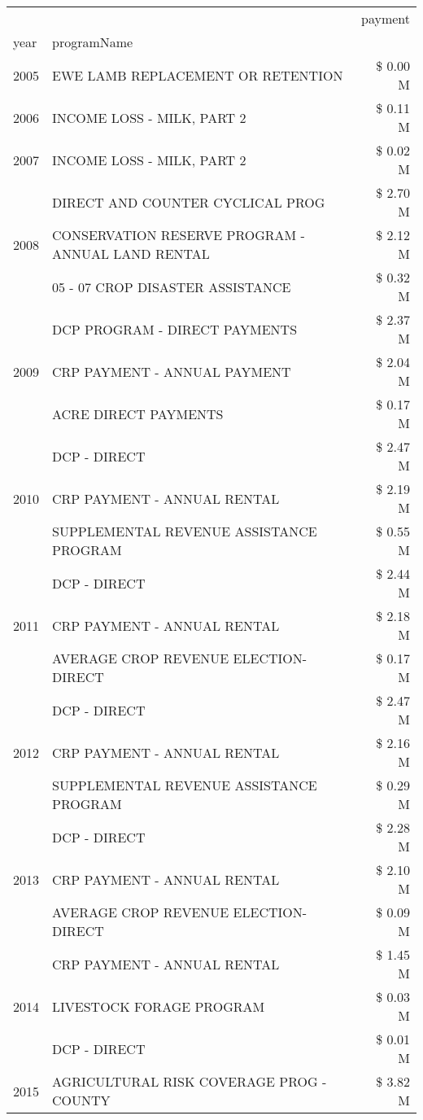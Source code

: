 \begin{tabular}{llr}
\toprule
 &  & payment \\
year & programName &  \\
\midrule
2005 & EWE LAMB REPLACEMENT OR RETENTION & \$ 0.00 M \\
\cline{1-3}
2006 & INCOME LOSS - MILK, PART 2 & \$ 0.11 M \\
\cline{1-3}
2007 & INCOME LOSS - MILK, PART 2 & \$ 0.02 M \\
\cline{1-3}
\multirow[t]{3}{*}{2008} & DIRECT AND COUNTER CYCLICAL PROG & \$ 2.70 M \\
 & CONSERVATION RESERVE PROGRAM - ANNUAL LAND RENTAL & \$ 2.12 M \\
 & 05 - 07 CROP DISASTER ASSISTANCE & \$ 0.32 M \\
\cline{1-3}
\multirow[t]{3}{*}{2009} & DCP PROGRAM - DIRECT PAYMENTS & \$ 2.37 M \\
 & CRP PAYMENT - ANNUAL PAYMENT & \$ 2.04 M \\
 & ACRE DIRECT PAYMENTS & \$ 0.17 M \\
\cline{1-3}
\multirow[t]{3}{*}{2010} & DCP - DIRECT & \$ 2.47 M \\
 & CRP PAYMENT - ANNUAL RENTAL & \$ 2.19 M \\
 & SUPPLEMENTAL REVENUE ASSISTANCE PROGRAM & \$ 0.55 M \\
\cline{1-3}
\multirow[t]{3}{*}{2011} & DCP - DIRECT & \$ 2.44 M \\
 & CRP PAYMENT - ANNUAL RENTAL & \$ 2.18 M \\
 & AVERAGE CROP REVENUE ELECTION-DIRECT & \$ 0.17 M \\
\cline{1-3}
\multirow[t]{3}{*}{2012} & DCP - DIRECT & \$ 2.47 M \\
 & CRP PAYMENT - ANNUAL RENTAL & \$ 2.16 M \\
 & SUPPLEMENTAL REVENUE ASSISTANCE PROGRAM & \$ 0.29 M \\
\cline{1-3}
\multirow[t]{3}{*}{2013} & DCP - DIRECT & \$ 2.28 M \\
 & CRP PAYMENT - ANNUAL RENTAL & \$ 2.10 M \\
 & AVERAGE CROP REVENUE ELECTION-DIRECT & \$ 0.09 M \\
\cline{1-3}
\multirow[t]{3}{*}{2014} & CRP PAYMENT - ANNUAL RENTAL & \$ 1.45 M \\
 & LIVESTOCK FORAGE PROGRAM & \$ 0.03 M \\
 & DCP - DIRECT & \$ 0.01 M \\
\cline{1-3}
\multirow[t]{3}{*}{2015} & AGRICULTURAL RISK COVERAGE PROG - COUNTY & \$ 3.82 M \\

\end{tabular}
